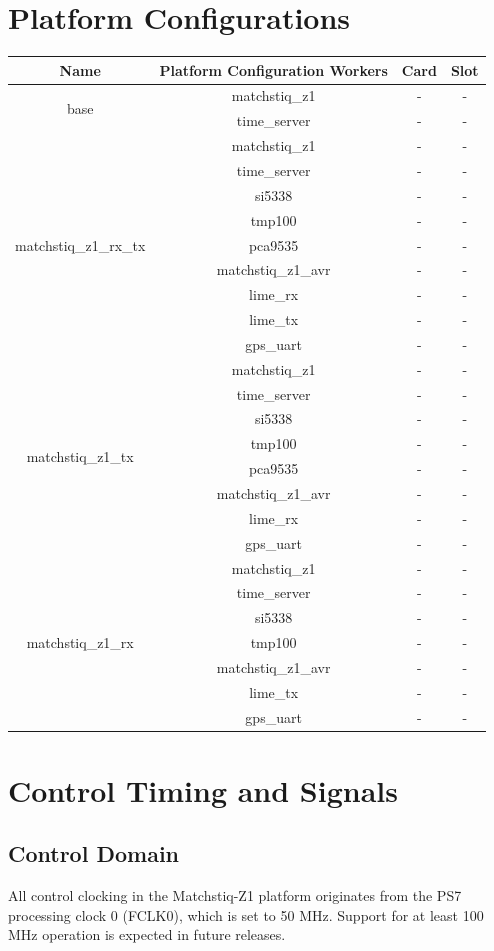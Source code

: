 \documentclass{article}
\def\comp{matchstiq\_z1}
\begin{document}
\section*{Platform Configurations}
	\begin{tabular}{|c|c|c|c|}
		\hline
		\rowcolor{blue}
		Name & Platform Configuration Workers & Card & Slot \\
		\hline
		\multirow{2}{*}{base} &\comp & - & - \\ &time\_server & - & - \\
		\hline
		\multirow{9}{*}{matchstiq\_z1\_rx\_tx} &\comp & - & - \\ &time\_server & - & - \\ &si5338 & - & - \\ &tmp100 & - & - \\ &pca9535 & - & - \\ &matchstiq\_z1\_avr & - & - \\ &lime\_rx & - & - \\ &lime\_tx & - & - \\ &gps\_uart & - & - \\
		\hline
		\multirow{8}{*}{matchstiq\_z1\_tx} &\comp & - & - \\ &time\_server & - & - \\ &si5338 & - & - \\ &tmp100 & - & - \\ &pca9535 & - & - \\ &matchstiq\_z1\_avr & - & - \\ &lime\_rx & - & - \\ &gps\_uart & - & - \\
		\hline
		\multirow{7}{*}{matchstiq\_z1\_rx} &\comp & - & - \\ &time\_server & - & - \\ &si5338 & - & - \\ &tmp100 & - & - \\ &matchstiq\_z1\_avr & - & - \\ &lime\_tx & - & - \\ &gps\_uart & - & - \\
		\hline
	\end{tabular}

\section*{Control Timing and Signals}
\subsection*{Control Domain}
All control clocking in the Matchstiq-Z1 platform originates from the PS7 processing clock 0 (FCLK0), which is set to 50 MHz. Support for at least 100 MHz operation is expected in future releases.
\end{document}
